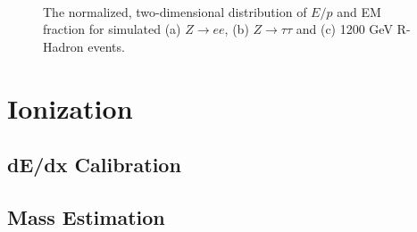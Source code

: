 \begin{figure}[htb]
\centering
{}
\\
\caption{The normalized, two-dimensional distribution of $E/p$ and EM fraction for simulated (a) $Z\rightarrow ee$, (b) $Z\rightarrow \tau\tau$ and (c) 1200 GeV R-Hadron events.}
\label{fig:nm1_isopt}
\end{figure}



\section{Ionization}

\subsection{dE/dx Calibration}

\subsection{Mass Estimation}
\label{sec:mass_requirement}
